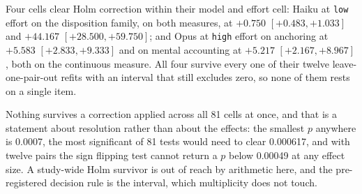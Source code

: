 \label{sec:incidence}\label{app:incidence}
Four cells clear Holm correction within their model and effort cell: Haiku at
\texttt{low} effort on the disposition family, on both measures, at $+0.750$
$[+0.483, +1.033]$ and $+44.167$ $[+28.500, +59.750]$; and Opus at
\texttt{high} effort on anchoring at $+5.583$ $[+2.833, +9.333]$ and on
mental accounting at $+5.217$ $[+2.167, +8.967]$, both on the continuous
measure. All four survive every one of their twelve leave-one-pair-out refits
with an interval that still excludes zero, so none of them rests on a single
item.

Nothing survives a correction applied across all 81 cells at once, and that
is a statement about resolution rather than about the effects: the smallest
$p$ anywhere is 0.0007, the most significant of 81 tests would need to clear
0.000617, and with twelve pairs the sign flipping test cannot return a $p$
below 0.00049 at any effect size. A study-wide Holm survivor is out of reach
by arithmetic here, and the pre-registered decision rule is the interval,
which multiplicity does not touch.
